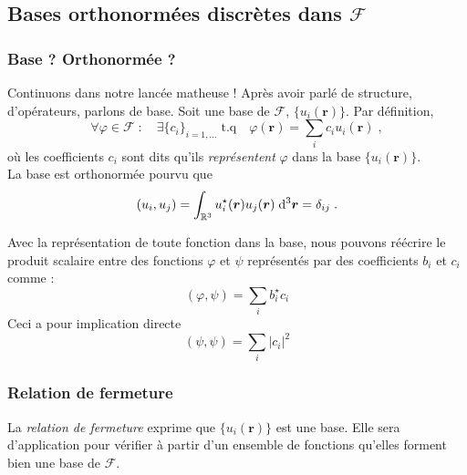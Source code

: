 \documentclass[../notesdecours.tex]{subfiles}
\begin{document}
\subsection{Bases orthonormées discrètes dans $\mathcal F$}
\subsubsection{Base ? Orthonormée ?}
Continuons dans notre lancée matheuse ! Après avoir parlé de structure, d'opérateurs, parlons de base. Soit une base de $\mathcal F$, $\{u_i(\bm{r})\}$. Par définition, 
\begin{equation}
\label{eq:base_orthonormee_F}
\forall \varphi \in \mathcal F \; : \quad \exists \{c_i\}_{i=1, ...} \; \mathrm{t.q} \quad \varphi(\bm{r}) = \sum_i c_i u_i(\bm{r}) \; ,
\end{equation}
où les coefficients $c_i$ sont dits qu'ils \textit{représentent} $\varphi$ dans la base $\{u_i(\bm{r})\}$.\\

La base est orthonormée pourvu que 
\begin{equation}
\label{eq:orthonorm_F}
(u_i, u_j) = \int_{\mathbb R ^3} u_i ^\star(\bm{r}) u_j(\bm{r}) \; \mathrm{d} ^3 \bm{r} = \delta_{ij} \; .
\end{equation}

Avec la représentation de toute fonction dans la base, nous pouvons réécrire le produit scalaire entre des fonctions $\varphi$ et $\psi$ représentés par des coefficients $b_i$ et $c_i$ comme :
$$(\varphi, \psi) = \sum_i b_i ^\star c_i$$
Ceci a pour implication directe 
\begin{equation}
\label{eq:base_orthonormee_coeffsci}
(\psi, \psi) = \sum_i |c_i|^2
\end{equation}

\subsubsection{Relation de fermeture}
La \textit{relation de fermeture} exprime que $\{u_i(\bm{r})\}$ est une base. Elle sera d'application pour vérifier à partir d'un ensemble de fonctions qu'elles forment bien une base de $\mathcal F$.
\end{document}
